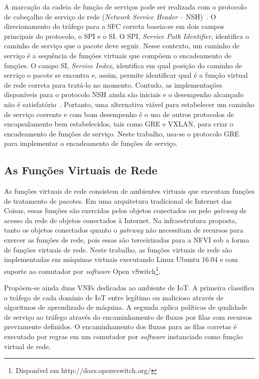 \documentclass[12pt]{article}
\begin{document}
A marcação da cadeia de função de serviços pode ser realizada com o protocolo de cabeçalho de serviço de rede ({\it Network Service Header} – NSH)~\cite{sameer-neo-nsh,nsh-ietf-draft-12}. O direcionamento do tráfego para a SFC correta baseia-se em dois campos principais do protocolo, o SPI e o SI. O SPI, {\it Service Path Identifier}, identifica o caminho de serviço que o pacote deve seguir. Nesse contexto, um caminho de serviço é a sequência de funções virtuais que compõem o encadeamento de funções. O campo SI, {\it Service Index}, identifica em qual posição do caminho de serviço o pacote se encontra e, assim, permite identificar qual é a função virtual de rede correta para tratá-lo no momento. Contudo, as implementações disponíveis para o protocolo NSH ainda são iniciais e o desempenho alcançado não é satisfatório~\cite{sbseg-nfv}. Portanto, uma alternativa viável para estabelecer um caminho de serviço coerente e com bom desempenho é o uso de outros protocolos de encapsulamento bem estabelecidos, tais como GRE e VXLAN, para criar o encadeamento de funções de serviço. Neste trabalho, usa-se o protocolo GRE para implementar o encadeamento de funções de serviço.

\subsection{As Funções Virtuais de Rede}

As funções virtuais de rede consistem de ambientes virtuais que executam funções de tratamento de pacotes. Em uma arquitetura tradicional de Internet das Coisas, essas funções são exercidas pelos objetos conectados ou pelo {\it gateway} de acesso da rede de objetos conectados à Internet. Na infraestrutura proposta, tanto os objetos conectados quanto o {\it gateway} não necessitam de recursos para exercer as funções de rede, pois essas são terceirizadas para a NFVI sob a forma de funções virtuais de rede. Neste trabalho, as funções virtuais de rede são implementadas em máquinas virtuais executando Linux Ubuntu 16.04 %
e com suporte ao comutador por {\it software} Open vSwitch\footnote{Disponível em http://docs.openvswitch.org/}.

Propõem-se ainda duas VNFs dedicadas ao ambiente de IoT. A primeira classifica o tráfego de cada domínio de IoT entre legítimo ou malicioso através de algoritmos de aprendizado de máquina. A segunda aplica políticas de qualidade de serviço ao tráfego através do encaminhamento de fluxos por filas com recursos previamente definidos. O encaminhamento dos fluxos para as filas corretas é executado por regras em um comutador por \textit{software} instanciado como função virtual de rede.
\end{document}
